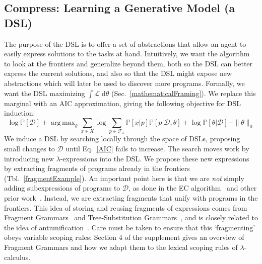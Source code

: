 \documentclass{article}
\newcommand{\system}{\textsc{EC$^2$} }
\newcommand{\lowerBound}{\mathscr{L}}
\DeclareMathOperator*{\argmax}{arg\,max} %
\newcommand{\probability}{\mathds{P}} %
\begin{document}
\subsection{Compress: Learning a Generative Model (a DSL)}\label{grammarInductionSection}

The purpose of the DSL is to
offer a set of abstractions
that allow an agent to easily express solutions to the tasks at hand.
Intuitively, we want the algorithm to
look at  the frontiers and
generalize beyond them, 
both so the DSL can better express the current solutions,
and  also so that the DSL might expose new abstractions
which will later be used to
discover more programs.
 Formally, we want the DSL maximizing $\int \lowerBound\;\mathrm{d}\theta$ (Sec.~\ref{mathematicalFraming}).
We replace this marginal with an AIC approximation, giving the following objective for DSL induction:
\begin{equation}
      \log \probability[\mathcal{D}] + \argmax_{\theta}\sum_{x\in X}\log \sum_{p\in \mathcal{F}_x}\probability[x|p]\probability[p|\mathcal{D},\theta] + \log \probability[\theta|\mathcal{D}] - \|\theta\|_0 \label{AIC}
  \end{equation}
We induce a DSL by searching locally through the space of DSLs,
proposing small changes to $\mathcal{D}$ until Eq.~\ref{AIC} fails to increase.
The search moves work by introducing new
$\lambda$-expressions into the DSL.
We propose these new expressions by extracting fragments of
programs already in the frontiers (Tbl.~\ref{fragmentExample}).
An important point here is that we are \emph{not} simply adding
subexpressions of programs to $\mathcal{D}$, as done in the EC algorithm~\cite{Dechter:2013:BLV:2540128.2540316} and other prior work~\cite{DBLP:conf/ecai/LinDETM14}.  Instead, we are
extracting fragments that unify with programs in the frontiers.  This
idea of storing and reusing fragments of expressions comes from
Fragment Grammars~\cite{tim} and Tree-Substitution
Grammars~\cite{cohn2010inducing}, and is closely related to the idea
of antiunification~\cite{henderson2013cumulative,hwang2011inducing}.
Care must be taken
to ensure that
this `fragmenting' obeys variable scoping rules;
Section 4 of the supplement gives an overview of Fragment Grammars
and how we adapt them to the lexical scoping rules of $\lambda$-calculus.
\end{document}
